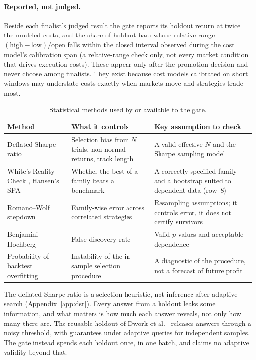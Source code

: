 \documentclass[11pt]{article}
\begin{document}
\paragraph{Reported, not judged.} Beside each finalist's judged result the gate reports its holdout return at twice the modeled costs, and the share of holdout bars whose relative range $(\mathrm{high}-\mathrm{low})/\mathrm{open}$ falls within the closed interval observed during the cost model's calibration span (a relative-range check only, not every market condition that drives execution costs). These appear only after the promotion decision and never choose among finalists. They exist because cost models calibrated on short windows may understate costs exactly when markets move and strategies trade most.

\begin{table}[ht]
\centering
\small
\begin{tabularx}{\textwidth}{@{}>{\raggedright\arraybackslash}p{3.3cm}>{\raggedright\arraybackslash}X>{\raggedright\arraybackslash}X@{}}
\toprule
Method & What it controls & Key assumption to check \\
\midrule
Deflated Sharpe ratio \cite{bailey2014} & Selection bias from $N$ trials, non-normal returns, track length & A valid effective $N$ and the Sharpe sampling model \\
White's Reality Check \cite{white2000}, Hansen's SPA \cite{hansen2005} & Whether the best of a family beats a benchmark & A correctly specified family and a bootstrap suited to dependent data (row~8) \\
Romano--Wolf stepdown \cite{romano2005} & Family-wise error across correlated strategies & Resampling assumptions; it controls error, it does not certify survivors \\
Benjamini--Hochberg \cite{bh1995} & False discovery rate & Valid $p$-values and acceptable dependence \\
Probability of backtest overfitting \cite{bailey2017} & Instability of the in-sample selection procedure & A diagnostic of the procedure, not a forecast of future profit \\
\bottomrule
\end{tabularx}
\caption{Statistical methods used by or available to the gate.}
\label{tab:methods}
\end{table}

The deflated Sharpe ratio is a selection heuristic, not inference after adaptive search (Appendix~\ref{app:dsr}). Every answer from a holdout leaks some information, and what matters is how much each answer reveals, not only how many there are. The reusable holdout of Dwork et al.\ \cite{dwork2015} releases answers through a noisy threshold, with guarantees under adaptive queries for independent samples. The gate instead spends each holdout once, in one batch, and claims no adaptive validity beyond that.
\end{document}
